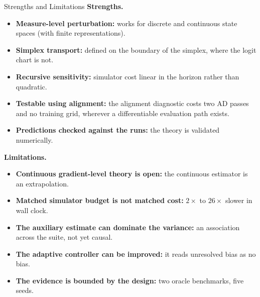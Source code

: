\documentclass[9pt]{beamer}
\begin{document}
\begin{frame}{Strengths and Limitations}
\small
\textbf{Strengths.}
\begin{itemize}
  \item \textbf{Measure-level perturbation:} works for discrete and continuous state spaces (with finite representations).
  \item \textbf{Simplex transport:} defined on the boundary of the simplex, where the logit chart is not.
  \item \textbf{Recursive sensitivity:} simulator cost linear in the horizon rather than quadratic.
  \item \textbf{Testable using alignment:} the alignment diagnostic costs two AD passes and no training grid, wherever a differentiable evaluation path exists.
  \item \textbf{Predictions checked against the runs:} the theory is validated numerically.
\end{itemize}

\vspace{0.3cm}
\textbf{Limitations.}
\begin{itemize}
  \item \textbf{Continuous gradient-level theory is open:} the continuous estimator is an extrapolation.
  \item \textbf{Matched simulator budget is not matched cost:} $2\times$ to $26\times$ slower in wall clock.
  \item \textbf{The auxiliary estimate can dominate the variance:} an association across the suite, not yet causal.
  \item \textbf{The adaptive controller can be improved:} it reads unresolved bias as no bias.
  \item \textbf{The evidence is bounded by the design:} two oracle benchmarks, five seeds.
\end{itemize}
\end{frame}
\end{document}
